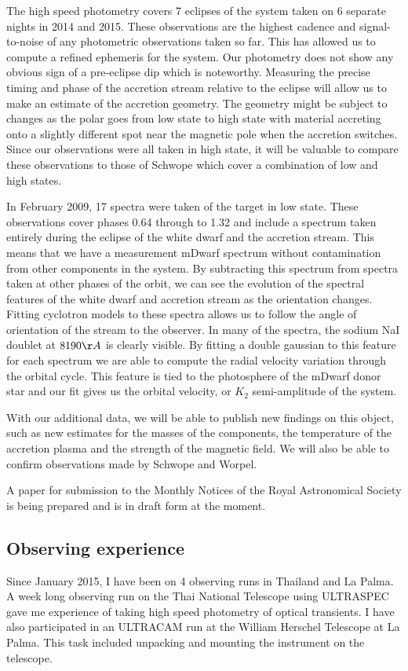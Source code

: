 \documentclass[a4paper,fleqn,usenatbib]{mnras}
\begin{document}
The high speed photometry covers 7 eclipses of the system taken on 6 separate nights in 2014 and 2015. These observations are the highest cadence and signal-to-noise of any photometric observations taken so far. This has allowed us to compute a refined ephemeris for the system. Our photometry does not show any obvious sign of a pre-eclipse dip which is noteworthy. Measuring the precise timing and phase of the accretion stream relative to the eclipse will allow us to make an estimate of the accretion geometry. The geometry might be subject to changes as the polar goes from low state to high state with material accreting onto a slightly different spot near the magnetic pole when the accretion switches. Since our observations were all taken in high state, it will be valuable to compare these observations to those of Schwope which cover a combination of low and high states. 

In February 2009, 17 spectra were taken of the target in low state. These observations cover phases 0.64 through to 1.32 and include a spectrum taken entirely during the eclipse of the white dwarf and the accretion stream. This means that we have a measurement mDwarf spectrum without contamination from other components in the system. By subtracting this spectrum from spectra taken at other phases of the orbit, we can see the evolution of the spectral features of the white dwarf and accretion stream as the orientation changes. Fitting cyclotron models to these spectra allows us to follow the angle of orientation of the stream to the observer. In many of the spectra, the sodium NaI doublet at $8190 \AA$ is clearly visible. By fitting a double gaussian to this feature for each spectrum we are able to compute the radial velocity variation through the orbital cycle. This feature is tied to the photosphere of the mDwarf donor star and our fit gives us the orbital velocity, or $K_2$ semi-amplitude of the system. 

With our additional data, we will be able to publish new findings on this object, such as new estimates for the masses of the components, the temperature of the accretion plasma and the strength of the magnetic field. We will also be able to confirm observations made by Schwope and Worpel. 

A paper for submission to the Monthly Notices of the Royal Astronomical Society is being prepared and is in draft form at the moment. 

\subsection{Observing experience}
Since January 2015, I have been on 4 observing runs in Thailand and La Palma. A week long observing run on the Thai National Telescope using ULTRASPEC gave me experience of taking high speed photometry of optical transients. I have also participated in an ULTRACAM run at the William Herschel Telescope at La Palma. This task included unpacking and mounting the instrument on the telescope. 
\end{document}
